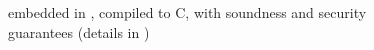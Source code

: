 {\begin{figure}
\begin{tikzpicture}
  \end{tikzpicture}

  \caption{\lowstar embedded in \fstar, compiled to C, with soundness and
  security guarantees (details in )}
  \label{fig:bigpicture}
  \vspace{-2ex}
\end{figure}
}

